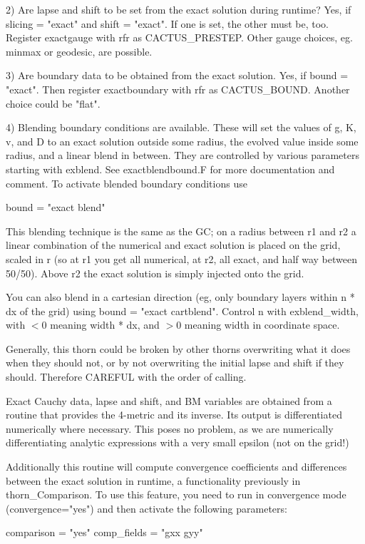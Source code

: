 2) Are lapse and shift to be set from the exact solution during
runtime? Yes, if slicing = "exact" and shift = "exact". If one
is set, the other must be, too. Register exactgauge with
rfr as	CACTUS\_PRESTEP. Other gauge choices, eg. minmax or geodesic,
are possible.

3) Are boundary data to be obtained from the exact solution. Yes, if
bound = "exact". Then register exactboundary with rfr as
CACTUS\_BOUND. Another choice could be "flat".

4) Blending boundary conditions are available. These will set the
values of g, K, v, and D to an exact solution outside some radius, the
evolved value inside some radius, and a linear blend in between. They
are controlled by various parameters starting with exblend. See
exactblendbound.F for more documentation and comment. To activate
blended boundary conditions use

bound = "exact blend"

This blending technique is the same as the GC; on a radius between r1 and   
r2 a linear combination of the numerical and exact solution is placed on  
the grid, scaled in r (so at r1 you get all numerical, at r2, all exact,  
and half way between 50/50). Above r2 the exact solution is simply 
injected onto the grid.        

You can also blend in a cartesian direction (eg, only boundary layers
within n * dx of the grid) using bound = "exact cartblend". Control n
with exblend\_width, with $< 0$ meaning width * dx, and $> 0$ meaning width
in coordinate space.

Generally, this thorn could be broken by other thorns overwriting what
it does when they should not, or by not overwriting the initial lapse
and shift if they should. Therefore CAREFUL with the order of calling.

Exact Cauchy data, lapse and shift, and BM variables are obtained from
a routine that provides the 4-metric and its inverse. Its output is
differentiated numerically where necessary. This poses no problem, as
we are numerically differentiating analytic expressions with a very
small epsilon (not on the grid!)

Additionally this routine will compute convergence coefficients and
differences between the exact solution in runtime, a functionality
previously in thorn\_Comparison.  To use this feature, you need to run
in convergence mode (convergence="yes") and then activate the
following parameters:

comparison = "yes"
comp\_fields = "gxx gyy" 

